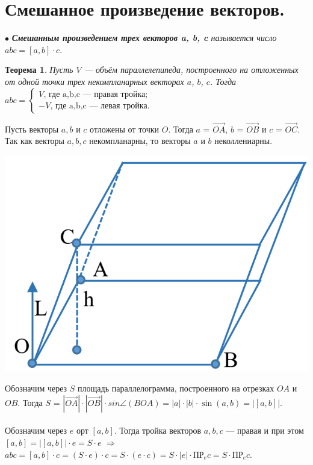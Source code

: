 \section{Смешанное произведение векторов.}
$\bullet$ \textit{\textbf{Смешанным произведением трех векторов a, b, c} называется число $abc = [a,b]\cdot c$.}
\newtheorem*{th2_6_1}{Теорема}\begin{th2_6_1}
	Пусть $V$ --- объём параллелепипеда, построенного на отложенных от одной точки трех некомпланарных векторах $a$, $b$, $c$. Тогда $abc = \begin{cases} V\text{, где a,b,c --- правая тройка}; \\  
		-V\text{, где a,b,c  --- левая тройка}. \end{cases}$ \end{th2_6_1}
\begin{Proof}
	Пусть векторы $a,b$ и $c$ отложены от точки $O$. Тогда $a$ = $\overrightarrow{OA}$, $b$ = $\overrightarrow{OB}$ и $c$ = $\overrightarrow{OC}$. Так как векторы $a, b, c$ некомпланарны, то векторы $a$ и $b$ неколлениарны.\\
	\begin{center}
		\includegraphics[scale=0.2]{images/par_2_6.png}
	\end{center}
	Обозначим через $S$ площадь параллелограмма, построенного на отрезках $OA$ и $OB$. Тогда $S$ = $|\overrightarrow{OA}|\cdot|\overrightarrow{OB}|\cdot sin \angle (BOA) = |a| \cdot |b| \cdot \sin(a, b) = |[a, b]|$. \\\\
	Обозначим через $e$ орт $[a, b]$. Тогда тройка векторов $a, b, c$ --- правая и при этом \\ $[a, b] = |[a, b]|\cdot e = S \cdot e$ $\Rightarrow$ $abc = [a, b]\cdot c = (S \cdot e) \cdot c = S \cdot (e \cdot c) = S\cdot|e|\cdot\text{ПР}_e c = S\cdot\text{ПР}_e c$. \\\\

\end{Proof}
